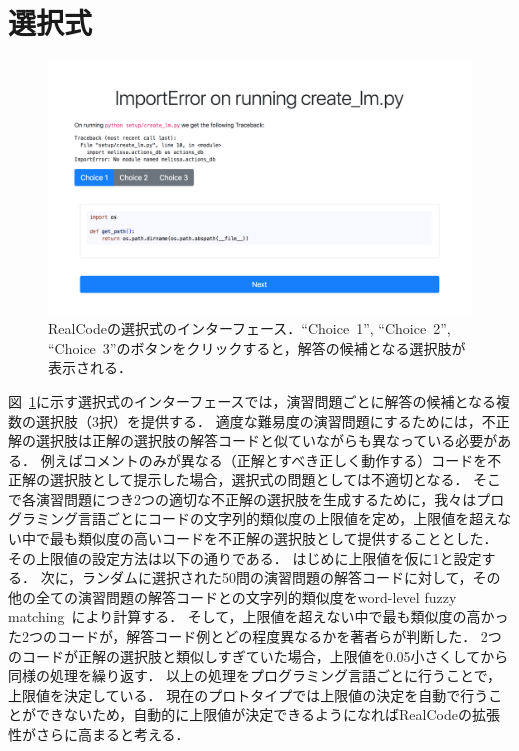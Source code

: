 

\section{選択式}
\begin{figure}[t]
	\centering
  \includegraphics[width=1.0\columnwidth]{20181228-interface-mcq.png}
  \caption{RealCodeの選択式のインターフェース．``Choice~1'', ``Choice~2'', ``Choice~3''のボタンをクリックすると，解答の候補となる選択肢が表示される．}
  \label{fig:mcq}
\end{figure}

図~\ref{fig:mcq}に示す選択式のインターフェースでは，演習問題ごとに解答の候補となる複数の選択肢（3択）を提供する．
適度な難易度の演習問題にするためには，不正解の選択肢は正解の選択肢の解答コードと似ていながらも異なっている必要がある．
例えばコメントのみが異なる（正解とすべき正しく動作する）コードを不正解の選択肢として提示した場合，選択式の問題としては不適切となる．
そこで各演習問題につき2つの適切な不正解の選択肢を生成するために，我々はプログラミング言語ごとにコードの文字列的類似度の上限値を定め，上限値を超えない中で最も類似度の高いコードを不正解の選択肢として提供することとした．
その上限値の設定方法は以下の通りである．
はじめに上限値を仮に1と設定する．
次に，ランダムに選択された50問の演習問題の解答コードに対して，その他の全ての演習問題の解答コードとの文字列的類似度をword-level fuzzy matching~\cite{sankoff1983time}により計算する．
そして，上限値を超えない中で最も類似度の高かった2つのコードが，解答コード例とどの程度異なるかを著者らが判断した．
2つのコードが正解の選択肢と類似しすぎていた場合，上限値を0.05小さくしてから同様の処理を繰り返す．
以上の処理をプログラミング言語ごとに行うことで，上限値を決定している．
現在のプロトタイプでは上限値の決定を自動で行うことができないため，自動的に上限値が決定できるようになればRealCodeの拡張性がさらに高まると考える．



